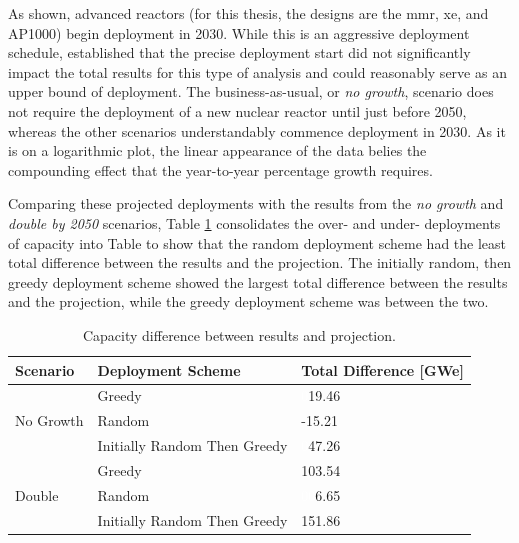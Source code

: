 As shown, advanced reactors (for this thesis, the designs are the \gls{mmr},
\gls{xe}, and AP1000) begin deployment in 2030. While this is an aggressive deployment schedule, \cite{bachmann_thesis_2023} established that the precise deployment start did not significantly impact the total results for this type of analysis and could reasonably serve as an upper bound of deployment. The business-as-usual, or \textit{no growth}, scenario does not require the deployment of a new nuclear reactor until just before 2050, whereas the other scenarios understandably commence deployment in 2030. As it is on a logarithmic plot, the linear appearance of the data belies the compounding effect that the year-to-year percentage growth requires.

Comparing these projected deployments with the results from the \textit{no growth} and \textit{double by 2050} scenarios, Table \ref{tab:cap_diff} consolidates the over- and under- deployments of capacity into Table to show that the random deployment scheme had the least total difference between the results and the projection. The initially random, then greedy deployment scheme showed the largest total difference between the results and the projection, while the greedy deployment scheme was between the two.

\begin{table}[H]
    \centering
    \caption{Capacity difference between results and projection.}
    \label{tab:cap_diff}
    \begin{tabular}{l l l}
        \hline
        \textbf{Scenario} & \textbf{Deployment Scheme} & \textbf{Total Difference [GWe]}\\
        \hline
        \multirow{3}{*}{No Growth} & Greedy & \textcolor{white}{0}19.46 \\
        & Random & -15.21 \\
        & Initially Random Then Greedy & \textcolor{white}{0}47.26 \\
        \hline
        \multirow{3}{*}{Double} & Greedy & 103.54 \\
        & Random & \textcolor{white}{00}6.65 \\
        & Initially Random Then Greedy & 151.86 \\
        \hline
    \end{tabular}
\end{table}

